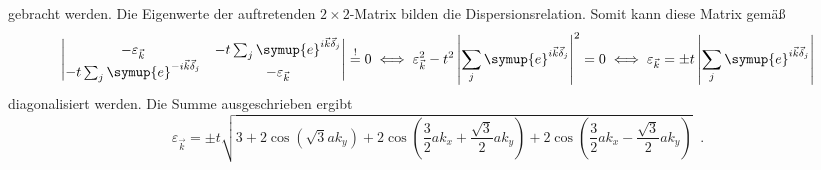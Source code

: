 gebracht werden.
Die Eigenwerte der auftretenden $2 \times 2$-Matrix bilden die Dispersionsrelation.
Somit kann diese Matrix gemäß
\begin{equation*}
    \begin{vmatrix}
        -\varepsilon_{\vec{k}} & -t\sum_{j} \symup{e}^{i\vec{k}\vec{\delta}_j}     \\
        -t\sum_{j} \symup{e}^{-i\vec{k}\vec{\delta}_j} & -\varepsilon_{\vec{k}}     
    \end{vmatrix} \stackrel{!}{=} 0 
    \iff \varepsilon_{\vec{k}}^2 - t^2 \left | \sum_{j} \symup{e}^{i\vec{k}\vec{\delta}_j} \right |^2 = 0 
    \iff \varepsilon_{\vec{k}} = \pm t \left | \sum_{j} \symup{e}^{i\vec{k}\vec{\delta}_j} \right |
\end{equation*}
diagonalisiert werden.
Die Summe ausgeschrieben ergibt
\begin{equation*}
    \varepsilon_{\vec{k}} = \pm t \sqrt{3+2 \cos \left ( \sqrt{3}ak_y \right )+2\cos \left ( \frac{3}{2}ak_x+\frac{\sqrt{3}}{2}ak_y \right ) + 2\cos \left ( \frac{3}{2}ak_x-\frac{\sqrt{3}}{2}ak_y \right ) } \; \; .
    \label{eqn:dispersion_graphene_calc}
\end{equation*}
